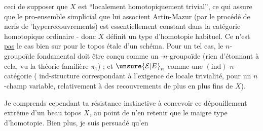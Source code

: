 ceci de supposer que $X$ est ``localement homotopiquement trivial'', ce qui assure que le pro-ensemble simplicial que lui associent Artin-Mazur (par le procédé de nerfs de 'hyperrecouvrements) est essentiellement constant dans la catégorie homotopique ordinaire - donc $X$ définit un type d'homotopie habituel. Ce n'est \uline{pas} le cas bien sur pour le topos étale d'un schéma. Pour un tel cas, le $n$-groupoïde fondamental doit être conçu comme un -$n$-groupoïde (rien d'étonnant à cela, vu la théorie familière  $\pi_1$) ; et $\unsure{\mathcal E|E}_n$ comme une $(\mathrm{ind})$-$n$-catégorie ( ind-structure correspondant à l'exigence de locale trivialité, pour un $n$-champ variable, relativement à des recouvrements de plus en plus fins de $X$).


Je comprends cependant ta résistance instinctive à concevoir ce dépouillement extrême d'un beau topos $X$, au point de n'en retenir que le maigre type d'homotopie. Bien plus, je suis persuadé qu'en
